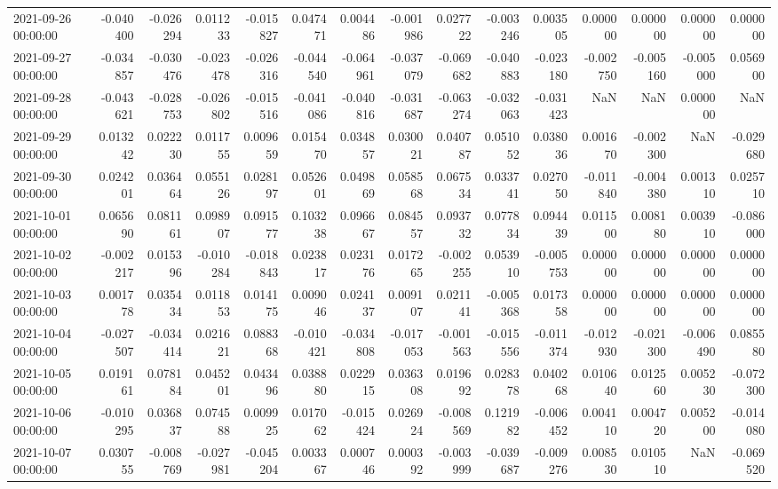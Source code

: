 \begin{tabular}{lrrrrrrrrrrrrrr}
2021-09-26 00:00:00 & -0.040400 & -0.026294 & 0.011233 & -0.015827 & 0.047471 & 0.004486 & -0.001986 & 0.027722 & -0.003246 & 0.003505 & 0.000000 & 0.000000 & 0.000000 & 0.000000 \\
2021-09-27 00:00:00 & -0.034857 & -0.030476 & -0.023478 & -0.026316 & -0.044540 & -0.064961 & -0.037079 & -0.069682 & -0.040883 & -0.023180 & -0.002750 & -0.005160 & -0.005000 & 0.056900 \\
2021-09-28 00:00:00 & -0.043621 & -0.028753 & -0.026802 & -0.015516 & -0.041086 & -0.040816 & -0.031687 & -0.063274 & -0.032063 & -0.031423 & NaN & NaN & 0.000000 & NaN \\
2021-09-29 00:00:00 & 0.013242 & 0.022230 & 0.011755 & 0.009659 & 0.015470 & 0.034857 & 0.030021 & 0.040787 & 0.051052 & 0.038036 & 0.001670 & -0.002300 & NaN & -0.029680 \\
2021-09-30 00:00:00 & 0.024201 & 0.036464 & 0.055126 & 0.028197 & 0.052601 & 0.049869 & 0.058568 & 0.067534 & 0.033741 & 0.027050 & -0.011840 & -0.004380 & 0.001310 & 0.025710 \\
2021-10-01 00:00:00 & 0.065690 & 0.081161 & 0.098907 & 0.091577 & 0.103238 & 0.096667 & 0.084557 & 0.093732 & 0.077834 & 0.094439 & 0.011500 & 0.008180 & 0.003910 & -0.086000 \\
2021-10-02 00:00:00 & -0.002217 & 0.015396 & -0.010284 & -0.018843 & 0.023817 & 0.023176 & 0.017265 & -0.002255 & 0.053910 & -0.005753 & 0.000000 & 0.000000 & 0.000000 & 0.000000 \\
2021-10-03 00:00:00 & 0.001778 & 0.035434 & 0.011853 & 0.014175 & 0.009046 & 0.024137 & 0.009107 & 0.021141 & -0.005368 & 0.017358 & 0.000000 & 0.000000 & 0.000000 & 0.000000 \\
2021-10-04 00:00:00 & -0.027507 & -0.034414 & 0.021621 & 0.088368 & -0.010421 & -0.034808 & -0.017053 & -0.001563 & -0.015556 & -0.011374 & -0.012930 & -0.021300 & -0.006490 & 0.085580 \\
2021-10-05 00:00:00 & 0.019161 & 0.078184 & 0.045201 & 0.043496 & 0.038880 & 0.022915 & 0.036308 & 0.019692 & 0.028378 & 0.040268 & 0.010640 & 0.012560 & 0.005230 & -0.072300 \\
2021-10-06 00:00:00 & -0.010295 & 0.036837 & 0.074588 & 0.009925 & 0.017062 & -0.015424 & 0.026924 & -0.008569 & 0.121982 & -0.006452 & 0.004110 & 0.004720 & 0.005200 & -0.014080 \\
2021-10-07 00:00:00 & 0.030755 & -0.008769 & -0.027981 & -0.045204 & 0.003367 & 0.000746 & 0.000392 & -0.003999 & -0.039687 & -0.009276 & 0.008530 & 0.010510 & NaN & -0.069520 \\

\end{tabular}
